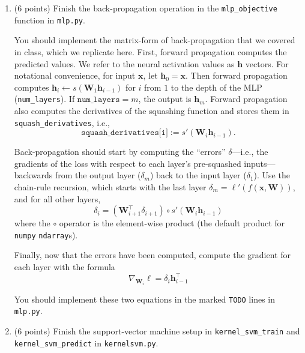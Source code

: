 \documentclass[10pt]{article}
\newcommand{\bx}{{\boldsymbol x}}
\newcommand{\bh}{{\boldsymbol h}}
\newcommand{\bW}{{\mathbf W}}
\begin{document}
\begin{enumerate}

\item (6 points) Finish the back-propagation operation in the \texttt{mlp\_objective} function in \texttt{mlp.py}. 

You should implement the matrix-form of back-propagation that we covered in class, which we replicate here. First, forward propagation computes the predicted values. We refer to the neural activation values as $\bh$ vectors. For notational convenience, for input $\bx$, let $\bh_0 = \bx$. Then forward propagation computes $\bh_i \leftarrow s\left( \bW_1 \bh_{i-1} \right)$ for $i$ from $1$ to the depth of the MLP (\texttt{num\_layers}). If $\texttt{num\_layers} = m$, the output is $\bh_m$. Forward propagation also computes the derivatives of the squashing function and stores them in \texttt{squash\_derivatives}, i.e., 
\[
\texttt{squash\_derivatives[i]} := s'\left(\bW_i \bh_{i-1}\right).
\]

Back-propagation should start by computing the ``errors'' $\delta$---i.e., the gradients of the loss with respect to each layer's pre-squashed inputs---backwards from the output layer ($\delta_m$) back to the input layer ($\delta_1$). Use the chain-rule recursion, which starts with the last layer $\delta_m = \ell'(f(\bx, \bW))$, and for all other layers,
\begin{equation}
\delta_i = \left( \bW_{i+1}^\top \delta_{i+1} \right) \circ s'\left( \bW_i \bh_{i-1} \right)
\end{equation}
where the $\circ$ operator is the element-wise product (the default product for \texttt{numpy} \texttt{ndarray}s).

Finally, now that the errors have been computed, compute the gradient for each layer with the formula
\begin{equation}
\nabla_{\bW_i} \ell = \delta_i \bh_{i - 1}^\top
\end{equation}

You should implement these two equations in the marked \texttt{TODO} lines in \texttt{mlp.py}.

\item (6 points) Finish the support-vector machine setup in \texttt{kernel\_svm\_train} and \texttt{kernel\_svm\_predict} in \texttt{kernelsvm.py}. 


\end{enumerate}
\end{document}
